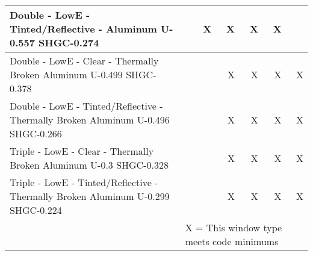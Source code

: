 \begin{table}
\begin{tabular}{p{2.5in}|rrrrrr}
Double - LowE - Tinted/Reflective - Aluminum \- U-0.557 SHGC-0.274                    &                   & X                  & X                  & X                  & X                  &       \\ \hline
Double - LowE - Clear - Thermally Broken Aluminum \- U-0.499 SHGC-0.378               &                   &                    & X                  & X                  & X                  & X     \\ \hline
Double - LowE - Tinted/Reflective - Thermally Broken Aluminum \- U-0.496 SHGC-0.266   &                   &                    & X                  & X                  & X                  & X     \\ \hline
Triple - LowE - Clear - Thermally Broken Aluminum \- U-0.3 SHGC-0.328                 &                   &                    & X                  & X                  & X                  & X     \\ \hline
Triple - LowE - Tinted/Reflective - Thermally Broken Aluminum \- U-0.299 SHGC-0.224   &                   &                    & X                  & X                  & X                  & X \\ \hline
& \multicolumn{6}{l}{X = This window type meets code minimums} \\
\end{tabular}
\end{table}